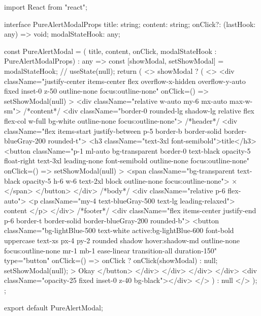 import React from "react";

interface PureAlertModalProps {
  title: string;
  content: string;
  onClick?: (lastHook: any) => void;
  modalStateHook: any;
}


const PureAlertModal = ({ title, content, onClick, modalStateHook } : PureAlertModalProps) : any => {
  const [showModal, setShowModal] = modalStateHook; // useState(null);
  return (
    <>
      {showModal ? (
        <>
          <div
            className="justify-center items-center flex overflow-x-hidden overflow-y-auto fixed inset-0 z-50 outline-none focus:outline-none"
            onClick={() => setShowModal(null)}
          >
            <div className="relative w-auto my-6 mx-auto max-w-sm">
              {/*content*/}
              <div className="border-0 rounded-lg shadow-lg relative flex flex-col w-full bg-white outline-none focus:outline-none">
                {/*header*/}
                <div className="flex items-start justify-between p-5 border-b border-solid border-blueGray-200 rounded-t">
                  <h3 className="text-3xl font-semibold">{title}</h3>
                  <button
                    className="p-1 ml-auto bg-transparent border-0 text-black opacity-5 float-right text-3xl leading-none font-semibold outline-none focus:outline-none"
                    onClick={() => setShowModal(null)}
                  >
                    <span className="bg-transparent text-black opacity-5 h-6 w-6 text-2xl block outline-none focus:outline-none">
                      ×
                    </span>
                  </button>
                </div>
                {/*body*/}
                <div className="relative p-6 flex-auto">
                  <p className="my-4 text-blueGray-500 text-lg leading-relaxed">
                    {content}
                  </p>
                </div>
                {/*footer*/}
                <div className="flex items-center justify-end p-6 border-t border-solid border-blueGray-200 rounded-b">
                  <button
                    className="bg-lightBlue-500 text-white active:bg-lightBlue-600 font-bold uppercase text-xs px-4 py-2 rounded shadow hover:shadow-md outline-none focus:outline-none mr-1 mb-1 ease-linear transition-all duration-150"
                    type="button"
                    onClick={() => {
                      onClick ? onClick(showModal) : null;
                      setShowModal(null);
                    }}
                  >
                    Okay
                  </button>
                </div>
              </div>
            </div>
          </div>
          <div className="opacity-25 fixed inset-0 z-40 bg-black"></div>
        </>
      ) : null}
    </>
  );
};

export default PureAlertModal;
